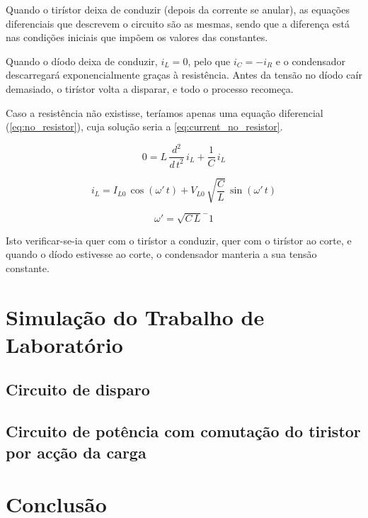 \documentclass[a4paper,11pt]{article}
\numberwithin{equation}{section}
\begin{document}
Quando o tirístor deixa de conduzir (depois da corrente se anular), as equações diferenciais que descrevem o circuito são as mesmas, sendo que a diferença está nas condições iniciais que impõem os valores das constantes.

Quando o díodo deixa de conduzir, $i_L = 0$, pelo que $i_C = -i_R$ e o condensador descarregará exponencialmente graças à resistência. Antes da tensão no díodo caír demasiado, o tirístor volta a disparar, e todo o processo recomeça.

Caso a resistência não existisse, teríamos apenas uma equação diferencial (\autoref{eq:no_resistor}), cuja solução seria a \autoref{eq:current_no_resistor}.

\begin{equation}
\label{eq:no_resistor}
0 = L\,\frac{d^2}{d\,t^2}\,i_L + \frac{1}{C}\,i_L
\end{equation}

\begin{equation}
\label{eq:current_no_resistor}
i_L = I_{L0}\,\cos{(\omega'\,t)} + V_{L0}\,\sqrt{\frac{C}{L}}\,\sin{(\omega'\,t)}
\end{equation}

\begin{equation}
\omega'=\sqrt{C\,L}^-1
\end{equation}

Isto verificar-se-ia quer com o tirístor a conduzir, quer com o tirístor ao corte, e quando o díodo estivesse ao corte, o condensador manteria a sua tensão constante.

\pagebreak

\section{Simulação do Trabalho de Laboratório}

\subsection{Circuito de disparo}

\subsection{Circuito de potência com comutação do tiristor por acção da carga}

\pagebreak

\section{Conclusão}
\end{document}
